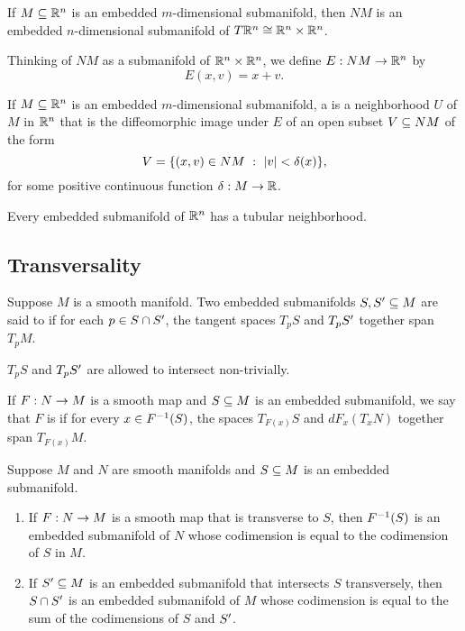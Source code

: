 \setcounter{thm}{22}

\begin{thm}
If $M\subseteq \mathbb{R}^n$ is an embedded $m$-dimensional submanifold, then $NM$ is an embedded $n$-dimensional submanifold of $T\mathbb{R}^n \cong \mathbb{R}^n\times\mathbb{R}^n$.
\end{thm}

\dfn Thinking of $NM$ as a submanifold of $\mathbb{R}^n\times\mathbb{R}^n$, we define $E:NM\rightarrow \mathbb{R}^n$ by
\[E(x,v) = x + v.\]

\dfn If $M\subseteq \mathbb{R}^n$ is an embedded $m$-dimensional submanifold, a  is a neighborhood $U$ of $M$ in $\mathbb{R}^n$ that is the diffeomorphic image under $E$ of an open subset $V\subseteq NM$ of the form
\[V = \{(x, v)\in NM\ :\ |v| < \delta(x)\},\]
for some positive continuous function $\delta:M\rightarrow \mathbb{R}$.

\begin{thm}
Every embedded submanifold of $\mathbb{R}^n$ has a tubular neighborhood.
\end{thm}

\subsection{Transversality}\nl

\dfn Suppose $M$ is a smooth manifold. Two embedded submanifolds $S,S^\prime\subseteq M$ are said to  if for each $p\in S\cap S^\prime$, the tangent spaces $T_pS$ and $T_pS^\prime$ together span $T_pM$.

\nb $T_pS$ and $T_pS^\prime$ are allowed to intersect non-trivially.

\dfn If $F:N\rightarrow M$ is a smooth map and $S\subseteq M$ is an embedded submanifold, we say that $F$ is  if for every $x\in F^{-1}(S)$, the spaces $T_{F(x)}S$ and $dF_x(T_xN)$ together span $T_{F(x)}M$.

\setcounter{thm}{29}

\begin{thm}
Suppose $M$ and $N$ are smooth manifolds and $S\subseteq M$ is an embedded submanifold.
\begin{enumerate}
    \item If $F:N\rightarrow M$ is a smooth map that is transverse to $S$, then $F^{-1}(S)$ is an embedded submanifold of $N$ whose codimension is equal to the codimension of $S$ in $M$.
    \item If $S^\prime\subseteq M$ is an embedded submanifold that intersects $S$ transversely, then $S\cap S^\prime$ is an embedded submanifold of $M$ whose codimension is equal to the sum of the codimensions of $S$ and $S^\prime$.
\end{enumerate}
\end{thm}
